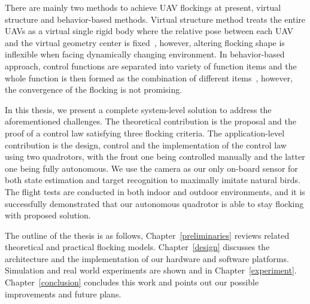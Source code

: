 There are mainly two methods to achieve UAV flockings at present, virtual structure and behavior-based methods. Virtual structure method treats the entire UAVs as a virtual single rigid body where the relative pose between each UAV and the virtual geometry center is fixed~\cite{Virtual2008,Askari2015,Cai2012}, however, altering flocking shape is inflexible when facing dynamically changing environment. In behavior-based approach, control functions are separated into variety of function items and the whole function is then formed as the combination of different items~\cite{Zhang2018,Martin2014,Vicsek2018}, however, the convergence of the flocking is not promising.

In this thesis, we present a complete system-level solution to address the aforementioned challenges. The theoretical contribution is the proposal and the proof of a control law satisfying three flocking criteria. The application-level contribution is the design, control and the implementation of the control law using two quadrotors, with the front one being controlled manually and the latter one being fully autonomous. We use the camera as our only on-board sensor for both state estimation and target recognition to maximally imitate natural birds. The flight tests are conducted in both indoor and outdoor environments, and it is successfully demonstrated that our autonomous quadrotor is able to stay flocking with proposed solution.

The outline of the thesis is as follows, Chapter~\ref{preliminaries} reviews related theoretical and practical flocking models. Chapter~\ref{design} discusses the architecture and the implementation of our hardware and software platforms. Simulation and real world experiments are shown and in Chapter~\ref{experiment}. Chapter~\ref{conclusion} concludes this work and points out our possible improvements and future plans.

\newpage